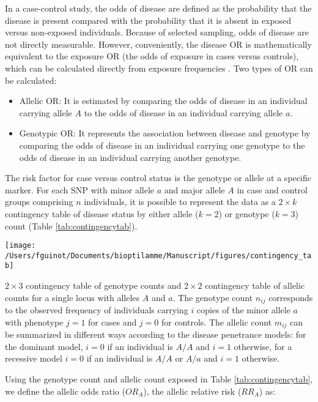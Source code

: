 \documentclass[]{book}
\begin{document}
In a case-control study, the odds of disease are defined as the
probability that the disease is present compared with the probability
that it is absent in exposed versus non-exposed individuals. Because of
selected sampling, odds of disease are not directly measurable. However,
conveniently, the disease OR is mathematically equivalent to the
exposure OR (the odds of exposure in cases versus controls), which can
be calculated directly from exposure frequencies \citep{balding2008handbook}.
Two types of OR can be calculated:

\begin{itemize}
\item
  Allelic OR: It is estimated by comparing the odds of disease in an
  individual carrying allele \(A\) to the odds of disease in an
  individual carrying allele \(a\).
\item
  Genotypic OR: It represents the association between disease and
  genotype by comparing the odds of disease in an individual carrying
  one genotype to the odds of disease in an individual carrying
  another genotype.
\end{itemize}

The risk factor for case versus control status is the genotype or allele
at a specific marker. For each SNP with minor allele \(a\) and major
allele \(A\) in case and control groups comprising \(n\) individuals, it is
possible to represent the data as a \(2 \times k\) contingency table of
disease status by either allele (\(k = 2\)) or genotype (\(k = 3\)) count
(Table \ref{tab:contingencytab}).

\begin{center}\texttt{[image: /Users/fguinot/Documents/bioptilamme/Manuscript/figures/contingency\_tab]} \end{center}

\label{tab:contingencytab}\(2 \times 3\) contingency table of genotype counts and \(2 \times 2\) contingency table of allelic counts for a single locus with alleles \(A\) and \(a\). The genotype count \(n_{ij}\) corresponds to the observed frequency of individuals carrying \(i\) copies of the minor allele \(a\) with phenotype \(j=1\) for cases and \(j=0\) for controls. The allelic count \(m_{ij}\) can be summarized in different ways according to the disease penetrance models: for the dominant model, \(i=0\) if an individual is \(A/A\) and \(i=1\) otherwise, for a recessive model \(i=0\) if an individual is \(A/A\) or \(A/a\) and \(i=1\) otherwise.

Using the genotype count and allelic count exposed in Table
\ref{tab:contingencytab}, we define the allelic odds ratio (\(OR_A\)), the
allelic relative risk (\(RR_A\)) as:
\end{document}
